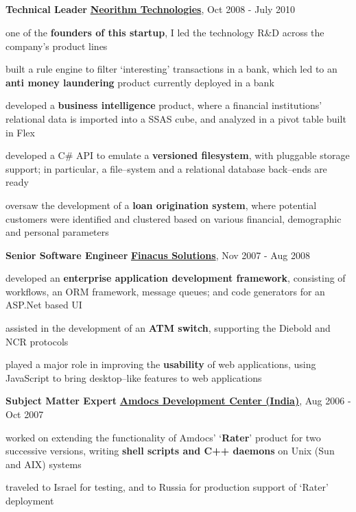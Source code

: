 \documentclass[a4paper,11pt,final]{article}
\newcommand{\resumetitle}[1]{%
  \subsection*{%
    \large\sc{#1}%
    \normalsize
  }%
  
}%
\newcommand{\jobexp}[5]{%
	\textbf{{#4}}
	\hfill
	\textbf{\href{#2}{#1}}, {#3}
	\\\vspace{-12pt}%
}
\newcommand{\resumedescheader}[1]{%
  \smallskip%
  \resumetitle{#1}
}%
\begin{document}
\resumedescheader{Career}
\jobexp
	{Neorithm Technologies}
	{http://www.neorithm.com}
	{Oct 2008 - July 2010}
	{Technical Leader}
	{Core team member since inception, led the technology R\&D across the company's product lines}
\begin{itemize*}
\item one of the \textbf{founders of this startup}, I led the technology R\&D across the company's product lines
\item built a rule engine to filter `interesting' transactions in a bank, which led to an \textbf{anti money laundering} product currently deployed in a bank
\item developed a \textbf{business intelligence} product, where a financial institutions' relational data is imported into a SSAS cube, and analyzed in a pivot table built in Flex
\item developed a C\# API to emulate a \textbf{versioned filesystem}, with pluggable storage support; in particular, a file--system and a relational database back--ends are ready
\item oversaw the development of a \textbf{loan origination system}, where potential customers were identified and clustered based on various financial, demographic and personal parameters
\end{itemize*}
\vspace{5pt}
\jobexp
	{Finacus Solutions}
	{http://www.finacus.com}
	{Nov 2007 - Aug 2008}
	{Senior Software Engineer}
	{Core team member, enabled rapid application development with an in-house framework}
\begin{itemize*}
\item developed an \textbf{enterprise application development framework}, consisting of workflows, an ORM framework, message queues; and code generators for an ASP.Net based UI
\item assisted in the development of an \textbf{ATM switch}, supporting the Diebold and NCR protocols
\item played a major role in improving the \textbf{usability} of web applications, using JavaScript to bring desktop--like features to web applications
\end{itemize*}
\vspace{5pt}
\jobexp
	{Amdocs Development Center (India)}
	{http://www.amdocs.com}
	{Aug 2006 - Oct 2007}
	{Subject Matter Expert}
	{Implemented Amdocs' telecom billing functionality using Unix processes}
\begin{itemize*}
\item worked on extending the functionality of Amdocs' `\textbf{Rater}' product for two successive versions, writing \textbf{shell scripts and C++ daemons} on Unix (Sun and AIX) systems
\item traveled to Israel for testing, and to Russia for production support of `Rater' deployment
\end{itemize*}
\end{document}
